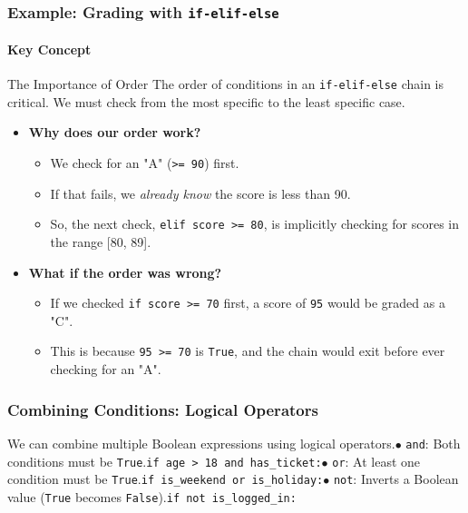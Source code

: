 \documentclass{beamer}
\begin{document}
\begin{frame}[fragile]
    \frametitle{Example: Grading with \texttt{if-elif-else}}
    \framesubtitle{Key Concept}
    
    \begin{block}{The Importance of Order}
        The order of conditions in an \texttt{if-elif-else} chain is critical. We must check from the most specific to the least specific case.
        \vspace{1em}
        \begin{itemize}
            \item \textbf{Why does our order work?}
            \begin{itemize}
                \item We check for an "A" (\texttt{>= 90}) first.
                \item If that fails, we \textit{already know} the score is less than 90.
                \item So, the next check, \texttt{elif score >= 80}, is implicitly checking for scores in the range [80, 89].
            \end{itemize}
            \vspace{0.5em}
            \item \textbf{What if the order was wrong?}
            \begin{itemize}
                \item If we checked \texttt{if score >= 70} first, a score of \texttt{95} would be graded as a "C".
                \item This is because \texttt{95 >= 70} is \texttt{True}, and the chain would exit before ever checking for an "A".
            \end{itemize}
        \end{itemize}
    \end{block}
    
\end{frame}

\begin{frame}[fragile]
                \frametitle{Combining Conditions: Logical Operators}
                We can combine multiple Boolean expressions using logical operators.\n\n$\bullet$ \texttt{and}: Both conditions must be \texttt{True}.\n  \texttt{if age > 18 and has_ticket:}\n\n$\bullet$ \texttt{or}: At least one condition must be \texttt{True}.\n  \texttt{if is_weekend or is_holiday:}\n\n$\bullet$ \texttt{not}: Inverts a Boolean value (\texttt{True} becomes \texttt{False}).\n  \texttt{if not is_logged_in:}
            \end{frame}
\end{document}
